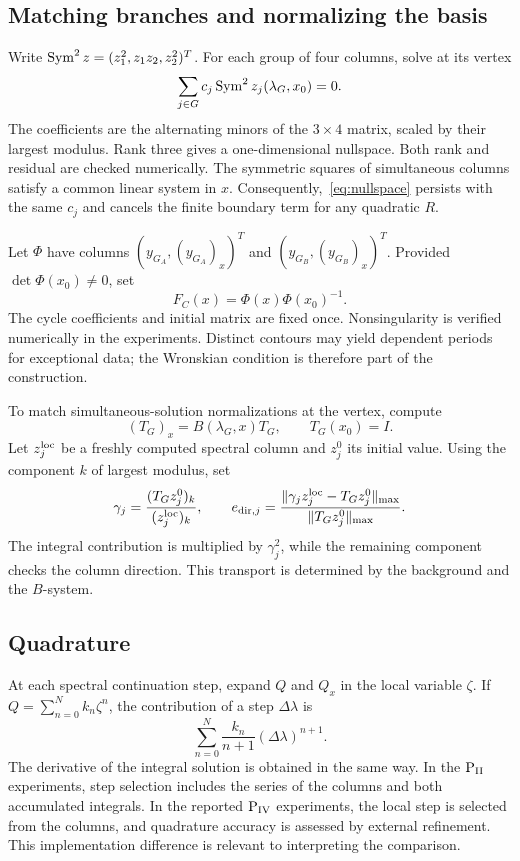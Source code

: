 \subsection{Matching branches and normalizing the basis}
Write $\operatorname{Sym}^2z=(z_1^2,z_1z_2,z_2^2)^T$.
For each group of four columns, solve at its vertex
\begin{equation}\label{eq:nullspace}
 \sum_{j\in G}c_j\operatorname{Sym}^2z_j(\lambda_G,x_0)=0.
\end{equation}
The coefficients are the alternating minors of the $3\times4$ matrix,
scaled by their largest modulus. Rank three gives a one-dimensional
nullspace. Both rank and residual are checked numerically.
The symmetric squares of simultaneous columns satisfy a common linear
system in $x$. Consequently,~\eqref{eq:nullspace} persists with the same
$c_j$ and cancels the finite boundary term for any quadratic $R$.

Let $\Phi$ have columns $(y_{G_A},(y_{G_A})_x)^T$ and
$(y_{G_B},(y_{G_B})_x)^T$. Provided $\det\Phi(x_0)\ne0$, set
\begin{equation*}
 F_C(x)=\Phi(x)\Phi(x_0)^{-1}.
\end{equation*}
The cycle coefficients and initial matrix are fixed once.
Nonsingularity is verified numerically in the experiments.
Distinct contours may yield dependent periods for exceptional data;
the Wronskian condition is therefore part of the construction.

To match simultaneous-solution normalizations at the vertex, compute
\begin{equation*}
 (T_G)_x=B(\lambda_G,x)T_G,\qquad T_G(x_0)=I.
\end{equation*}
Let $z_j^{\rm loc}$ be a freshly computed spectral column and $z_j^0$
its initial value. Using the component $k$ of largest modulus, set
\begin{equation}\label{eq:gamma}
 \gamma_j=\frac{(T_Gz_j^0)_k}{(z_j^{\rm loc})_k},\qquad
 e_{{\rm dir},j}=
 \frac{\lVert\gamma_jz_j^{\rm loc}-T_Gz_j^0\rVert_{\max}}{\lVert T_Gz_j^0\rVert_{\max}}.
\end{equation}
The integral contribution is multiplied by $\gamma_j^2$, while the
remaining component checks the column direction. This transport is
determined by the background and the $B$-system.

\subsection{Quadrature}
At each spectral continuation step, expand $Q$ and $Q_x$ in the local
variable $\zeta$. If $Q=\sum_{n=0}^N k_n\zeta^n$, the contribution of
a step $\Delta\lambda$ is
\begin{equation*}
 \sum_{n=0}^N\frac{k_n}{n+1}(\Delta\lambda)^{n+1}.
\end{equation*}
The derivative of the integral solution is obtained in the same way.
In the $\mathrm{P}_{\mathrm{II}}$ experiments, step selection includes the series of the
columns and both accumulated integrals. In the reported $\mathrm{P}_{\mathrm{IV}}$
experiments, the local step is selected from the columns, and quadrature
accuracy is assessed by external refinement. This implementation
difference is relevant to interpreting the comparison.

